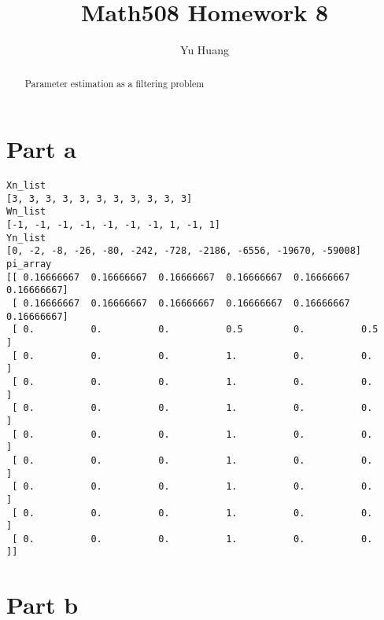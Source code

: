 \documentclass[a4paper,10pt]{article}
\title{Math508 Homework 8}
\author{Yu Huang}
\begin{document}
\maketitle

\begin{abstract}
Parameter estimation as a filtering problem
\end{abstract}

\section{Part a}

\begin{verbatim}
Xn_list
[3, 3, 3, 3, 3, 3, 3, 3, 3, 3, 3]
Wn_list
[-1, -1, -1, -1, -1, -1, -1, 1, -1, 1]
Yn_list
[0, -2, -8, -26, -80, -242, -728, -2186, -6556, -19670, -59008]
pi_array
[[ 0.16666667  0.16666667  0.16666667  0.16666667  0.16666667  0.16666667]
 [ 0.16666667  0.16666667  0.16666667  0.16666667  0.16666667  0.16666667]
 [ 0.          0.          0.          0.5         0.          0.5       ]
 [ 0.          0.          0.          1.          0.          0.        ]
 [ 0.          0.          0.          1.          0.          0.        ]
 [ 0.          0.          0.          1.          0.          0.        ]
 [ 0.          0.          0.          1.          0.          0.        ]
 [ 0.          0.          0.          1.          0.          0.        ]
 [ 0.          0.          0.          1.          0.          0.        ]
 [ 0.          0.          0.          1.          0.          0.        ]
 [ 0.          0.          0.          1.          0.          0.        ]]
\end{verbatim}


\section{Part b}
\end{document}
